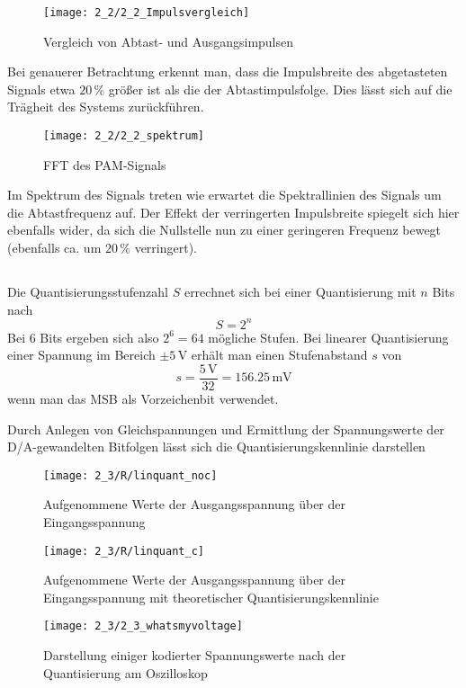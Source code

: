 \documentclass[a4paper, 12pt]{article}
\begin{document}
\begin{figure}[H]
	\texttt{[image: 2\_2/2\_2\_Impulsvergleich]}
  \caption{Vergleich von Abtast- und Ausgangsimpulsen} 
\end{figure}

Bei genauerer Betrachtung erkennt man, dass die Impulsbreite des abgetasteten
Signals etwa $20 \, \si{\percent}$ größer ist als die der Abtastimpulsfolge.
Dies lässt sich auf die Trägheit des Systems zurückführen.

\begin{figure}[H]
	\texttt{[image: 2\_2/2\_2\_spektrum]}
  \caption{FFT des PAM-Signals}
\end{figure}

Im Spektrum des Signals treten wie erwartet die Spektrallinien des Signals um
die Abtastfrequenz auf. 
Der Effekt der verringerten Impulsbreite spiegelt sich hier ebenfalls
wider, da sich die Nullstelle nun zu einer geringeren Frequenz bewegt (ebenfalls
ca. um $20 \, \si{\percent}$ verringert). 

\subsection{}
Die Quantisierungsstufenzahl $S$ errechnet sich bei einer Quantisierung mit $n$
Bits nach
\[ S = 2^n\]
Bei $6$ Bits ergeben sich also $2^6=64$ mögliche Stufen. Bei linearer
Quantisierung einer Spannung im Bereich $\pm 5 \, \si{\volt}$ erhält man einen
Stufenabstand $s$ von
\[ s = \frac{5 \, \si{\volt}}{32} =  156.25 \, \si{\milli\volt} \]
wenn man das MSB als Vorzeichenbit verwendet.

Durch Anlegen von Gleichspannungen und Ermittlung der Spannungswerte der
D/A-gewandelten Bitfolgen lässt sich die Quantisierungskennlinie darstellen

\begin{figure}[H]
	\texttt{[image: 2\_3/R/linquant\_noc]}
  \caption{Aufgenommene Werte der Ausgangsspannung über der Eingangsspannung}
\end{figure}

\begin{figure}[H]
	\texttt{[image: 2\_3/R/linquant\_c]}
  \caption{Aufgenommene Werte der Ausgangsspannung über der Eingangsspannung mit
  theoretischer Quantisierungskennlinie}
\end{figure}

\begin{figure}[H]
	\texttt{[image: 2\_3/2\_3\_whatsmyvoltage]}
  \caption{Darstellung einiger kodierter Spannungswerte nach der Quantisierung
    am Oszilloskop}
\end{figure}
\end{document}
